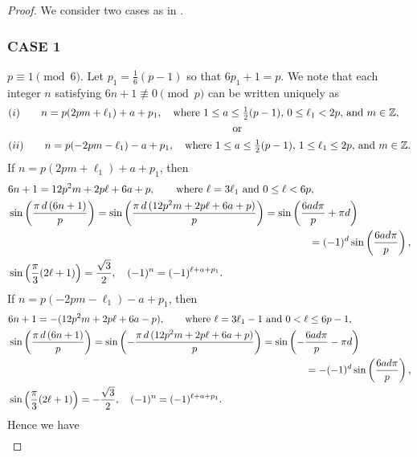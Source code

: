 \documentclass[12pt]{amsart}
\theoremstyle{definition}
\theoremstyle{remark}
\numberwithin{equation}{section}
\newcommand\Lpar[1]{\left(#1\right)}
\begin{document}
\begin{proof}
We consider two cases as in \cite[Theorem 5.1, p.225]{Ga19a}.

\subsubsection*{CASE 1} $p\equiv 1 \pmod{6}$. Let $p_1 = \frac{1}{6}(p-1)$
so that $6p_1+1=p$. We note that each integer $n$ satisfying $6n+1\not\equiv0
\pmod{p}$ can be written uniquely as
\begin{align*}
&(i) \qquad n=p(2pm+\ell_1) + a  + p_1, \quad
     \mbox{where $1\le a \le \frac{1}{2}(p-1)$, $0 \le \ell_1 < 2p$, and 
           $m \in \mathbb{Z}$,}\\
&\hspace{75mm}\mbox{or}\\
&(ii) \qquad n=p(-2pm-\ell_1) - a  + p_1, \quad
     \mbox{where $1\le a \le \frac{1}{2}(p-1)$, $1 \le \ell_1 \le 2p$, and 
           $m \in \mathbb{Z}$.}\\
\end{align*}
If $n=p(2pm+\ell_1) + a  + p_1$, then
\begin{align*}
&6n+1 = 12p^2m + 2p\ell + 6a+p,\qquad\mbox{where $\ell=3\ell_1$ and 
$0\le \ell < 6p$},
\\
&\sin\Lpar{\frac{\pi\,d\, (6n+1)}{p}} 
= \sin\Lpar{\frac{\pi\,d\, (12p^2m+2p\ell+6a+p)}{p}}
=\sin\Lpar{\frac{6ad\pi}{p}+\pi d}
\\
&\hspace{101mm}=(-1)^d\sin\Lpar{\frac{6ad\pi}{p}},
\\
&\sin\Lpar{\frac{\pi}{3}(2\ell+1)} = \frac{\sqrt{3}}{2}, \quad (-1)^n = (-1)^{\ell + a + p_1}.\\
\end{align*}
If $n=p(-2pm-\ell_1) - a  + p_1$, then
\begin{align*}
&6n+1 = -(12p^2m + 2p\ell + 6a-p),\qquad\mbox{where $\ell=3\ell_1-1$ and 
$0 < \ell \leq 6p-1$},
\\
&\sin\Lpar{\frac{\pi\,d\, (6n+1)}{p}} 
= \sin\Lpar{-\frac{\pi\,d\, (12p^2m+2p\ell+6a+p)}{p}}
= \sin\Lpar{-\frac{6ad\pi}{p}-\pi d}
\\
&\hspace{104mm}=-(-1)^d\sin\Lpar{\frac{6ad\pi}{p}},
\\
&\sin\Lpar{\frac{\pi}{3}(2\ell+1)} = -\frac{\sqrt{3}}{2}, \quad
(-1)^n = (-1)^{\ell + a + p_1}.\\
\end{align*}
Hence we have
\begin{align*}

\end{align*}
\end{proof}
\end{document}
